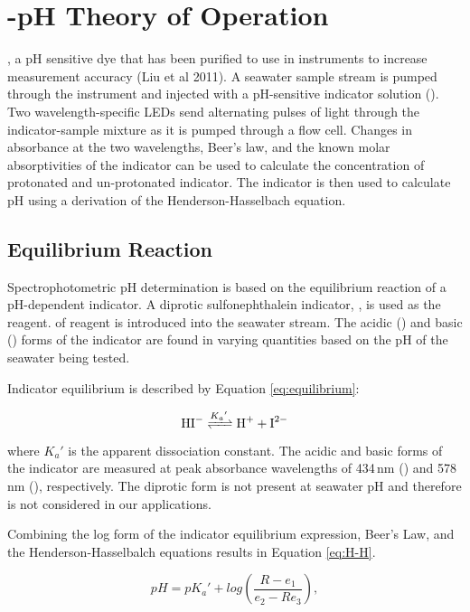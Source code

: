 \section{\instType{}-pH Theory of Operation}

\mCP{}, a pH sensitive dye that has been purified to use in \instType{} instruments to increase measurement accuracy (Liu et al 2011).  A seawater sample stream is pumped through the instrument and injected with a pH-sensitive indicator solution (\mCP{}). Two wavelength-specific LEDs send alternating pulses of light through the indicator-sample mixture as it is pumped through a flow cell. Changes in absorbance at the two wavelengths, Beer's law, and the known molar absorptivities of the indicator can be used to calculate the concentration of protonated and un-protonated indicator.  The indicator \pKa is then used to calculate pH using a derivation of the Henderson-Hasselbach equation. 


\subsection{Equilibrium Reaction}

Spectrophotometric pH determination is based on the equilibrium reaction of a pH-dependent indicator. A diprotic sulfonephthalein indicator, \mCP{}, is used as the reagent. \ifcase {}  \fi of reagent is introduced into the seawater stream. The acidic () and basic () forms of the indicator are found in varying quantities based on the pH of the seawater being tested.

Indicator equilibrium is described by Equation \ref{eq:equilibrium}:

\begin{equation}
\label{eq:equilibrium}
\ce{HI- <=>[{K_a}'] H+ + I^2-}
\end{equation}

where ${K_a}'$ is the apparent dissociation constant. The acidic and basic forms of the indicator are measured at peak absorbance wavelengths of 434\,nm () and 578\,nm (), respectively. The diprotic  form is not present at seawater pH and therefore is not considered in our applications.

Combining the log form of the indicator equilibrium expression, Beer's Law, and the Henderson-Hasselbalch equations results in Equation \ref{eq:H-H}.

\begin{equation}
\label{eq:H-H}
pH = {pK_a}' + log \left(\frac{R - e_1}{e_2 - R e_3}\right),
\end{equation}

